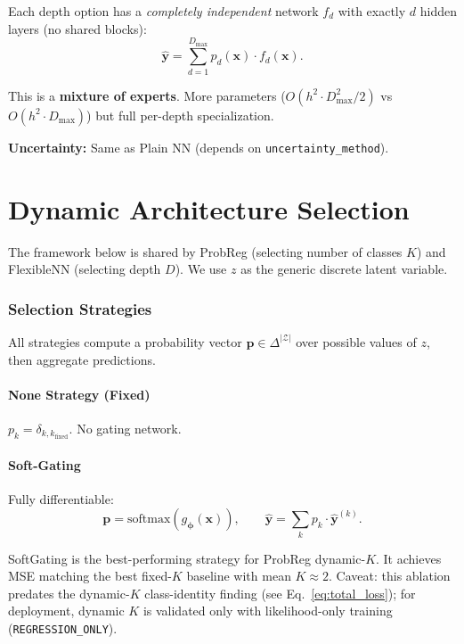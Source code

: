 \documentclass[11pt,a4paper]{article}
\theoremstyle{definition}
\newcommand{\bx}{\mathbf{x}}
\newcommand{\by}{\mathbf{y}}
\newcommand{\bphi}{\boldsymbol{\phi}}
\newcommand{\softmax}{\mathrm{softmax}}
\begin{document}
Each depth option has a \emph{completely independent} network $f_d$ with
exactly $d$ hidden layers (no shared blocks):
\[
  \hat{\by} = \sum_{d=1}^{D_{\max}} p_d(\bx) \cdot f_d(\bx).
\]

This is a \textbf{mixture of experts}. More parameters
($O(h^2 \cdot D_{\max}^2/2)$ vs $O(h^2 \cdot D_{\max})$) but full
per-depth specialization.

\textbf{Uncertainty:} Same as Plain NN (depends on \texttt{uncertainty\_method}).

\part{Dynamic Architecture Selection}

The framework below is shared by ProbReg (selecting number of classes $K$)
and FlexibleNN (selecting depth $D$). We use $z$ as the generic discrete
latent variable.

\section{Selection Strategies}
\label{sec:dynamic_k}

All strategies compute a probability vector $\mathbf{p} \in \Delta^{|\mathcal{Z}|}$
over possible values of $z$, then aggregate predictions.

\subsection{None Strategy (Fixed)}

$p_k = \delta_{k, k_{\mathrm{fixed}}}$. No gating network.

\subsection{Soft-Gating}

Fully differentiable:
\[
  \mathbf{p} = \softmax(g_\bphi(\bx)), \qquad
  \hat{\by} = \sum_{k} p_k \cdot \hat{\by}^{(k)}.
\]

\begin{implnote}
SoftGating is the best-performing strategy for ProbReg dynamic-$K$.
It achieves MSE matching the best fixed-$K$ baseline with mean $K \approx 2$.
Caveat: this ablation predates the dynamic-$K$ class-identity finding (see
Eq.~\eqref{eq:total_loss}); for deployment, dynamic $K$ is validated only with likelihood-only
training (\texttt{REGRESSION\_ONLY}).
\end{implnote}
\end{document}
